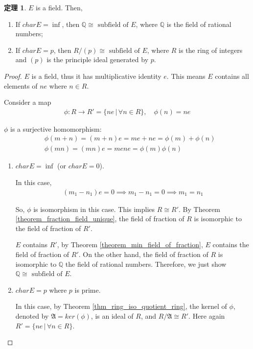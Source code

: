 \documentclass[utf8]{ctexbook}
\theoremstyle{definition}
\newtheorem{prototheorem}{定理}[section]
\newenvironment{theorem}
   {\colorlet{shadecolor}{red!30}\begin{shaded}\begin{prototheorem}}
   {\end{prototheorem}\end{shaded}}
\begin{document}
\begin{theorem}\label{thm_4_1_field_extension_iso}
$E$ is a field. Then,
\begin{enumerate}
\item{If $char E = \inf$, then $\mathbb{Q} \cong \mbox{ subfield of } E$, where $\mathbb{Q}$ is the field of rational numbers;}
\item{If $char E = p$, then $R/(p) \cong \mbox{ subfield of } E$, where $R$ is the ring of integers and $(p)$ is the principle ideal generated by $p$.}
\end{enumerate}
\end{theorem}

\begin{proof}
$E$ is a field, thus it has multiplicative identity $e$. This means $E$ contains all elements of $ne$ where $n \in R$.

Consider a map
\begin{align*}
\phi : R \longrightarrow R' = \{ ne \, | \, \forall n \in R \} , \quad  \phi(n) = ne
\end{align*} 

$\phi$ is a surjective homomorphism:
\begin{align*}
& \phi(m+n) = (m+n)e = me + ne = \phi(m) + \phi(n) \\
& \phi(mn) = (mn)e = me ne = \phi(m) \phi(n)
\end{align*}

\begin{enumerate}
\item{$char E = \inf $ (or $char E = 0$).

In this case,
\begin{align*}
(m_1 - n_1 ) e = 0 \implies m_1 - n_1 = 0 \implies m_1 = n_1
\end{align*}

So, $\phi$ is isomorphism in this case. This implies $R \cong R'$. By Theorem \ref{theorem_fraction_field_unique}, the field of fraction of $R$ is isomorphic to the field of fraction of $R'$. 

$E$ contains $R'$, by Theorem \ref{theorem_min_field_of_fraction}, $E$ contains the field of fraction of $R'$. On the other hand, the field of fraction of $R$ is isomorphic to $\mathbb{Q}$ the field of rational numbers. Therefore, we just show $\mathbb{Q} \cong \mbox{ subfield of } E$.
}
\item{$char E = p$ where $p$ is prime.

In this case, by Theorem \ref{thm_ring_iso_quotient_ring}, the kernel of $\phi$, denoted by $\mathfrak{A} = ker (\phi)$, is an ideal of $R$, and $R / \mathfrak{A} \cong R'$. Here again $R' = \{ ne\, | \, \forall n \in R \}$. 

}
\end{enumerate}
\end{proof}
\end{document}
